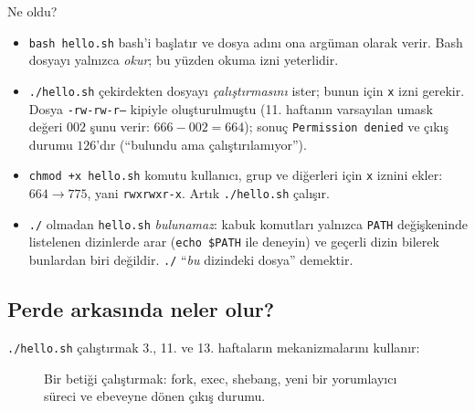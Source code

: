 \documentclass[11pt,a4paper]{article}
\newcommand{\cmd}[1]{\texttt{#1}}
\begin{document}
Ne oldu?
\begin{itemize}
  \item \cmd{bash hello.sh} bash'i başlatır ve dosya adını ona argüman olarak verir. Bash dosyayı yalnızca \emph{okur}; bu yüzden okuma izni yeterlidir.
  \item \cmd{./hello.sh} çekirdekten dosyayı \emph{çalıştırmasını} ister; bunun için \texttt{x} izni gerekir. Dosya \texttt{-rw-rw-r--} kipiyle oluşturulmuştu (11. haftanın varsayılan umask değeri $002$ şunu verir: $666 - 002 = 664$); sonuç \texttt{Permission denied} ve çıkış durumu $126$'dır (“bulundu ama çalıştırılamıyor”).
  \item \cmd{chmod +x hello.sh} komutu kullanıcı, grup ve diğerleri için \texttt{x} iznini ekler: $664 \to 775$, yani \texttt{rwxrwxr-x}. Artık \texttt{./hello.sh} çalışır.
  \item \texttt{./} olmadan \cmd{hello.sh} \emph{bulunamaz}: kabuk komutları yalnızca \texttt{PATH} değişkeninde listelenen dizinlerde arar (\cmd{echo \$PATH} ile deneyin) ve geçerli dizin bilerek bunlardan biri değildir. \texttt{./} “\emph{bu} dizindeki dosya” demektir.
\end{itemize}

\subsection{Perde arkasında neler olur?}

\texttt{./hello.sh} çalıştırmak 3., 11. ve 13. haftaların mekanizmalarını kullanır:

\begin{figure}[H]
\centering
{}
\caption{Bir betiği çalıştırmak: fork, exec, shebang, yeni bir yorumlayıcı süreci ve ebeveyne dönen çıkış durumu.}
\end{figure}
\end{document}

